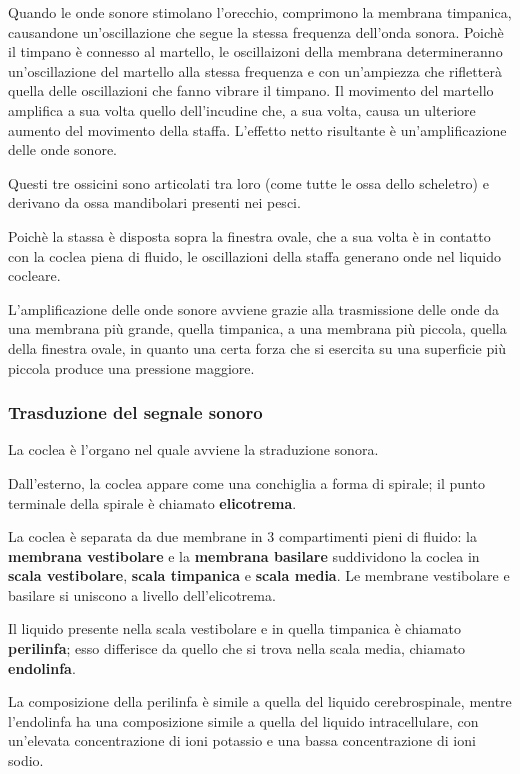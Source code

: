 \documentclass[]{article}
\begin{document}
Quando le onde sonore stimolano l'orecchio, comprimono la membrana
timpanica, causandone un'oscillazione che segue la stessa frequenza
dell'onda sonora. Poichè il timpano è connesso al martello, le
oscillaizoni della membrana determineranno un'oscillazione del martello
alla stessa frequenza e con un'ampiezza che rifletterà quella delle
oscillazioni che fanno vibrare il timpano. Il movimento del martello
amplifica a sua volta quello dell'incudine che, a sua volta, causa un
ulteriore aumento del movimento della staffa. L'effetto netto risultante
è un'amplificazione delle onde sonore.

Questi tre ossicini sono articolati tra loro (come tutte le ossa dello
scheletro) e derivano da ossa mandibolari presenti nei pesci.

Poichè la stassa è disposta sopra la finestra ovale, che a sua volta è
in contatto con la coclea piena di fluido, le oscillazioni della staffa
generano onde nel liquido cocleare.

L'amplificazione delle onde sonore avviene grazie alla trasmissione
delle onde da una membrana più grande, quella timpanica, a una membrana
più piccola, quella della finestra ovale, in quanto una certa forza che
si esercita su una superficie più piccola produce una pressione
maggiore.

\subsubsection{Trasduzione del segnale
sonoro}\label{trasduzione-del-segnale-sonoro}

La coclea è l'organo nel quale avviene la straduzione sonora.

Dall'esterno, la coclea appare come una conchiglia a forma di spirale;
il punto terminale della spirale è chiamato \textbf{elicotrema}.

La coclea è separata da due membrane in 3 compartimenti pieni di fluido:
la \textbf{membrana vestibolare} e la \textbf{membrana basilare}
suddividono la coclea in \textbf{scala vestibolare}, \textbf{scala
timpanica} e \textbf{scala media}. Le membrane vestibolare e basilare si
uniscono a livello dell'elicotrema.

Il liquido presente nella scala vestibolare e in quella timpanica è
chiamato \textbf{perilinfa}; esso differisce da quello che si trova
nella scala media, chiamato \textbf{endolinfa}.

La composizione della perilinfa è simile a quella del liquido
cerebrospinale, mentre l'endolinfa ha una composizione simile a quella
del liquido intracellulare, con un'elevata concentrazione di ioni
potassio e una bassa concentrazione di ioni sodio.
\end{document}
